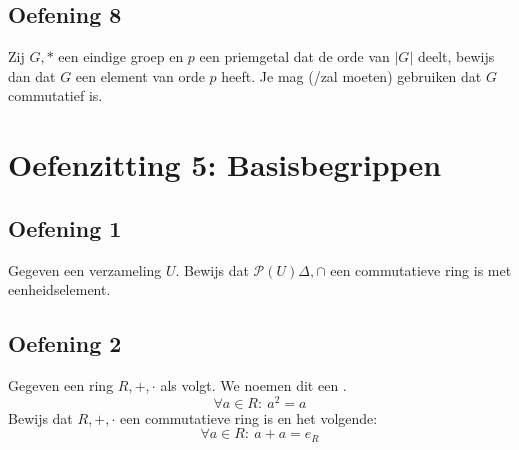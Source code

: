 \documentclass[main.tex]{subfiles}
\begin{document}
\subsection*{Oefening 8}
Zij $G,*$ een eindige groep en $p$ een priemgetal dat de orde van $|G|$ deelt, bewijs dan dat $G$ een element van orde $p$ heeft. Je mag (/zal moeten) gebruiken dat $G$ commutatief is.


\section{Oefenzitting 5: Basisbegrippen}

\subsection*{Oefening 1}
Gegeven een verzameling $U$.
Bewijs dat $\mathcal{P}(U)\Delta,\cap$ een commutatieve ring is met eenheidselement.

\subsection*{Oefening 2}
Gegeven een ring $R,+,\cdot$ als volgt.
We noemen dit een .
\[ \forall a\in R:\ a^{2} = a \]
Bewijs dat $R,+,\cdot$ een commutatieve ring is en het volgende:
\[ \forall a \in R:\ a+a = e_{R}\]

\end{document}
